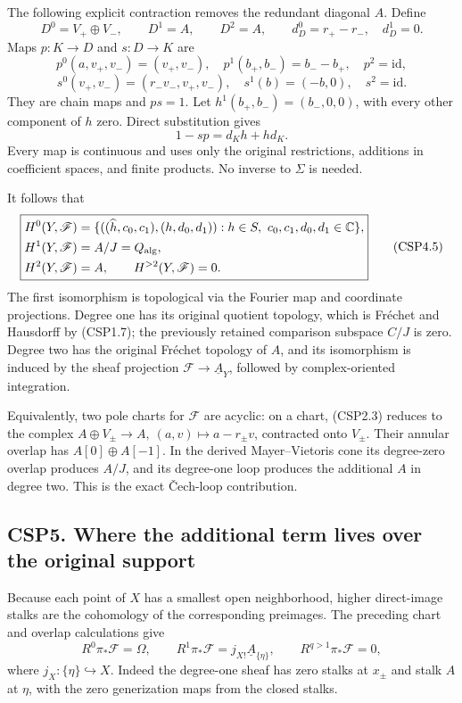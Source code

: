 The following explicit contraction removes the redundant diagonal \(A\).
Define \[
D^0=V_+\oplus V_-,\qquad D^1=A,\qquad D^2=A,
\qquad d_D^0=r_+-r_-,\quad d_D^1=0.
\tag{CSP4.2}
\] Maps \(p:K\to D\) and \(s:D\to K\) are \[
p^0(a,v_+,v_-)=(v_+,v_-),\quad
p^1(b_+,b_-)=b_--b_+,\quad p^2=\mathrm{id},
\] \[
s^0(v_+,v_-)=(r_-v_-,v_+,v_-),\quad
s^1(b)=(-b,0),\quad s^2=\mathrm{id}.
\tag{CSP4.3}
\] They are chain maps and \(ps=1\). Let \(h^1(b_+,b_-)=(b_-,0,0)\),
with every other component of \(h\) zero. Direct substitution gives \[
1-sp=d_Kh+hd_K.
\tag{CSP4.4}
\] Every map is continuous and uses only the original restrictions,
additions in coefficient spaces, and finite products. No inverse to
\(\Sigma\) is needed.

It follows that \[
\boxed{
\begin{aligned}
H^0(Y,\mathscr F)&=
\{((\widehat h,c_0,c_1),(h,d_0,d_1)):
h\in S,\ c_0,c_1,d_0,d_1\in\mathbb C\},\\
H^1(Y,\mathscr F)&=A/J=Q_{\rm alg},\\
H^2(Y,\mathscr F)&=A,\qquad H^{>2}(Y,\mathscr F)=0.
\end{aligned}}
\tag{CSP4.5}
\] The first isomorphism is topological via the Fourier map and
coordinate projections. Degree one has its original quotient topology,
which is Fréchet and Hausdorff by (CSP1.7); the previously retained
comparison subspace \(C/J\) is zero. Degree two has the original Fréchet
topology of \(A\), and its isomorphism is induced by the sheaf
projection \(\mathscr F\to\underline A_Y\), followed by complex-oriented
integration.

Equivalently, two pole charts for \(\mathscr F\) are acyclic: on a
chart, (CSP2.3) reduces to the complex
\(A\oplus V_\pm\to A,\ (a,v)\mapsto a-r_\pm v\), contracted onto
\(V_\pm\). Their annular overlap has \(A[0]\oplus A[-1]\). In the
derived Mayer--Vietoris cone its degree-zero overlap produces \(A/J\),
and its degree-one loop produces the additional \(A\) in degree two.
This is the exact Čech-loop contribution.

\subsection{CSP5. Where the additional term lives over the original
support}\label{csp5.-where-the-additional-term-lives-over-the-original-support}

Because each point of \(X\) has a smallest open neighborhood, higher
direct-image stalks are the cohomology of the corresponding preimages.
The preceding chart and overlap calculations give \[
R^0\pi_*\mathscr F=\Omega,\qquad
R^1\pi_*\mathscr F=j_{X!}\underline A_{\{\eta\}},
\qquad R^{q>1}\pi_*\mathscr F=0,
\tag{CSP5.1}
\] where \(j_X:\{\eta\}\hookrightarrow X\). Indeed the degree-one sheaf
has zero stalks at \(x_\pm\) and stalk \(A\) at \(\eta\), with the zero
generization maps from the closed stalks.

